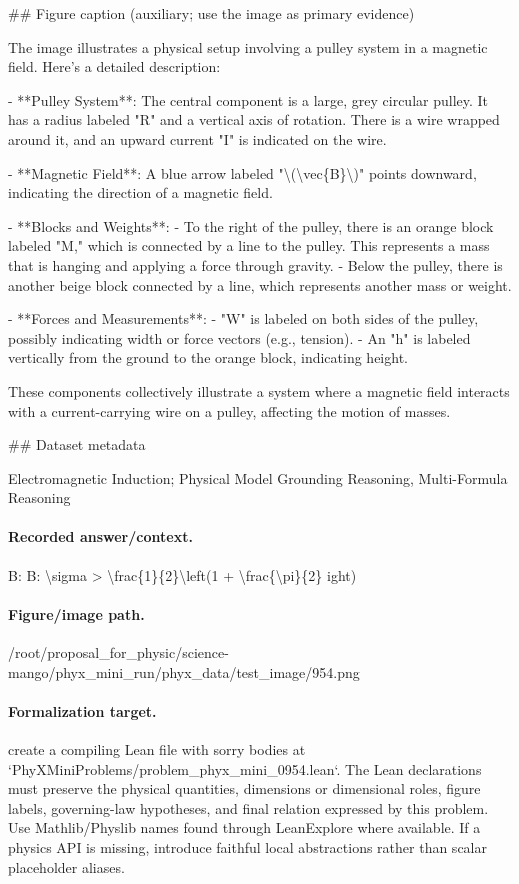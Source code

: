 \#\# Figure caption (auxiliary; use the image as primary evidence)

The image illustrates a physical setup involving a pulley system in a magnetic field. Here's a detailed description:

- **Pulley System**: The central component is a large, grey circular pulley. It has a radius labeled "R" and a vertical axis of rotation. There is a wire wrapped around it, and an upward current "I" is indicated on the wire.

- **Magnetic Field**: A blue arrow labeled "\textbackslash{}(\textbackslash{}vec\{B\}\textbackslash{})" points downward, indicating the direction of a magnetic field.

- **Blocks and Weights**: 
  - To the right of the pulley, there is an orange block labeled "M," which is connected by a line to the pulley. This represents a mass that is hanging and applying a force through gravity.
  - Below the pulley, there is another beige block connected by a line, which represents another mass or weight. 

- **Forces and Measurements**:
  - "W" is labeled on both sides of the pulley, possibly indicating width or force vectors (e.g., tension).
  - An "h" is labeled vertically from the ground to the orange block, indicating height.
  
These components collectively illustrate a system where a magnetic field interacts with a current-carrying wire on a pulley, affecting the motion of masses.

\#\# Dataset metadata

Electromagnetic Induction; Physical Model Grounding Reasoning, Multi-Formula Reasoning

\paragraph{Recorded answer/context.}
B: B: \textbackslash{}sigma > \textbackslash{}frac\{1\}\{2\}\textbackslash{}left(1 + \textbackslash{}frac\{\textbackslash{}pi\}\{2\}
ight)

\paragraph{Figure/image path.}
/root/proposal\_for\_physic/science-mango/phyx\_mini\_run/phyx\_data/test\_image/954.png

\paragraph{Formalization target.}
create a compiling Lean file with sorry bodies at `PhyXMiniProblems/problem\_phyx\_mini\_0954.lean`. The Lean declarations must preserve the physical quantities, dimensions or dimensional roles, figure labels, governing-law hypotheses, and final relation expressed by this problem.
Use Mathlib/Physlib names found through LeanExplore where available. If a physics API is missing, introduce faithful local abstractions rather than scalar placeholder aliases.

